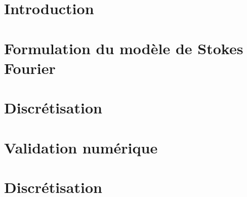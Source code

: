 \section{Introduction}
\label{sec:fourier-introduction}


\section{Formulation du modèle de Stokes Fourier}
\label{sec:fourier-model}


\section{Discrétisation}
\label{sec:fourier-discretisation}


\section{Validation numérique}
\label{sec:fourier-validation}


\section{Discrétisation}
\label{sec:fourier-application}

